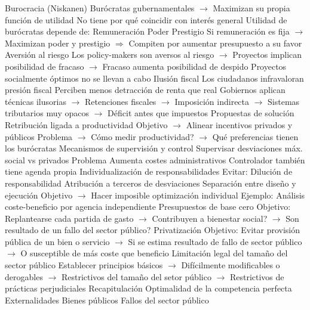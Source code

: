 \documentclass{nuevotema}
\begin{document}
\begin{esquemal}
			\3 Burocracia (Niskanen)
				\4 Burócratas gubernamentales
				\4[] $\to$ Maximizan su propia función de utilidad
				\4 No tiene por qué coincidir con interés general
				\4 Utilidad de burócratas depende de:
				\4[] Remuneración
				\4[] Poder
				\4[] Prestigio
				\4 Si remuneración es fija
				\4[] $\to$ Maximizan poder y prestigio
				\4[] $\Rightarrow$ Compiten por aumentar presupuesto a su favor
			\3 Aversión al riesgo
				\4 Los policy-makers son aversos al riesgo
				\4[] $\to$ Proyectos implican posibilidad de fracaso
				\4[] $\to$ Fracaso aumenta posibilidad de despido
				\4 Proyectos socialmente óptimos no se llevan a cabo
			\3 Ilusión fiscal
				\4 Los ciudadanos infravaloran presión fiscal
				\4[] Perciben menos detracción de renta que real
				\4 Gobiernos aplican técnicas ilusorias
				\4[] $\to$ Retenciones fiscales
				\4[] $\to$ Imposición indirecta
				\4[] $\to$ Sistemas tributarios muy opacos
				\4[] $\to$ Déficit antes que impuestos
		\2 Propuestas de solución
			\3 Retribución ligada a productividad
				\4 Objetivo
				\4[] $\to$ Alinear incentivos privados y públicos
				\4 Problema
				\4[] $\to$ Cómo medir productividad?
				\4[] $\to$ Qué preferencias tienen los burócratas
			\3 Mecanismos de supervisión y control
				\4 Supervisar desviaciones máx. social vs privados
				\4 Problema
				\4[] Aumenta costes administrativos
				\4[] Controlador también tiene agenda propia
			\3 Individualización de responsabilidades
				\4 Evitar:
				\4[] Dilución de responsabilidad
				\4[] Atribución a terceros de desviaciones
			\3 Separación entre diseño y ejecución
				\4 Objetivo
				\4[] $\to$ Hacer imposible optimización individual
				\4 Ejemplo:
				\4[] Análisis coste-beneficio por agencia independiente
			\3 Presupuestos de base cero
				\4 Objetivo:
				\4[] Replantearse cada partida de gasto
				\4[] $\to$ Contribuyen a bienestar social?
				\4[] $\to$ Son resultado de un fallo del sector público?
			\3 Privatización
				\4 Objetivo:
				\4[] Evitar provisión pública de un bien o servicio
				\4[] $\to$ Si se estima resultado de fallo de sector público
				\4[] $\to$ O susceptible de más coste que beneficio
			\3 Limitación legal del tamaño del sector público
				\4 Establecer principios básicos
				\4[] $\to$ Difícilmente modificables o derogables
				\4[] $\to$ Restrictivos del tamaño del setor público
				\4[] $\to$ Restrictivos de prácticas perjudiciales
	\1[] 
		\2 Recapitulación
			\3 Optimalidad de la competencia perfecta
			\3 Externalidades
			\3 Bienes públicos
			\3 Fallos del sector público

\end{esquemal}
\end{document}
